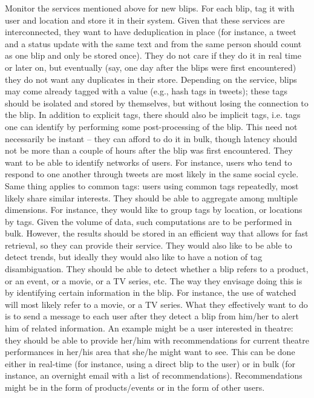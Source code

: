 \documentclass[12pt,twoside,a4paper]{article}
\begin{document}
    Monitor the services mentioned above for new blips. For each blip, tag it with user and location and store it in their system. Given that these services are interconnected, they want to have deduplication in place (for instance, a tweet and a status update with the same text and from the same person should count as one blip and only be stored once). They do not care if they do it in real time or later on, but eventually (say, one day after the blips were first encountered) they do not want any duplicates in their store. Depending on the service, blips may come already tagged with a value (e.g., hash tags in tweets); these tags should be isolated and stored by themselves, but without losing the connection to the blip.
    In addition to explicit tags, there should also be implicit tags, i.e. tags one can identify by performing some post-processing of the blip. This need not necessarily be instant -- they can afford to do it in bulk, though latency should not be more than a couple of hours after the blip was first encountered.
    They want to be able to identify networks of users. For instance, users who tend to respond to one another through tweets are most likely in the same social cycle. Same thing applies to common tags: users using common tags repeatedly, most likely share similar interests.
    They should be able to aggregate among multiple dimensions. For instance, they would like to group tags by location, or locations by tags. Given the volume of data, such computations are to be performed in bulk. However, the results should be stored in an efficient way that allows for fast retrieval, so they can provide their service.
    They would also like to be able to detect trends, but ideally they would also like to have a notion of tag disambiguation. They should be able to detect whether a blip refers to a product, or an event, or a movie, or a TV series, etc. The way they envisage doing this is by identifying certain information in the blip. For instance, the use of watched will most likely refer to a movie, or a TV series.
    What they effectively want to do is to send a message to each user after they detect a blip from him/her to alert him of related information. An example might be a user interested in theatre: they should be able to provide her/him with recommendations for current theatre performances in her/his area that she/he might want to see. This can be done either in real-time (for instance, using a direct blip to the user) or in bulk (for instance, an overnight email with a list of recommendations).
    Recommendations might be in the form of products/events or in the form of other users.
\end{document}
